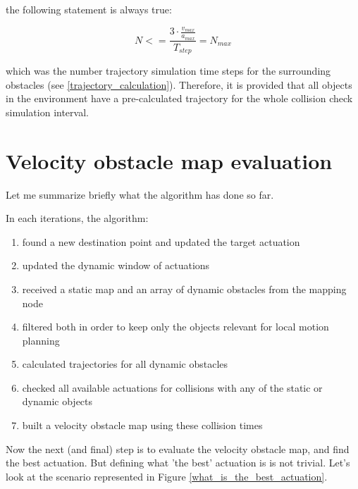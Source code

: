 the following statement is always true:

\begin{equation}\label{eq:collision_time_check_smaller_than_max}
N <= \frac{3 \cdot \frac{v_{max}}{a_{max}}}{T_{step}} = N_{max}
\end{equation}

which was the number trajectory simulation time steps for the surrounding obstacles (see \ref{trajectory_calculation}). Therefore, it is provided that all objects in the environment have a pre-calculated trajectory for the whole collision check simulation interval.

\begin{minipage}{\textwidth}
\section{Velocity obstacle map evaluation}
\label{chap:velocity_obstacle_map_evaluation}
Let me summarize briefly what the algorithm has done so far.

In each iterations, the algorithm:
\begin{enumerate}
  \item found a new destination point and updated the target actuation
  \item updated the dynamic window of actuations
  \item received a static map and an array of dynamic obstacles from the mapping node
  \item filtered both in order to keep only the objects relevant for local motion planning
  \item calculated trajectories for all dynamic obstacles
  \item checked all available actuations for collisions with any of the static or dynamic objects
  \item built a velocity obstacle map using these collision times
\end{enumerate}
\end{minipage}

Now the next (and final) step is to evaluate the velocity obstacle map, and find the best actuation. But defining what 'the best' actuation is is not trivial.
Let's look at the scenario represented in Figure \ref{what_is_the_best_actuation}.

